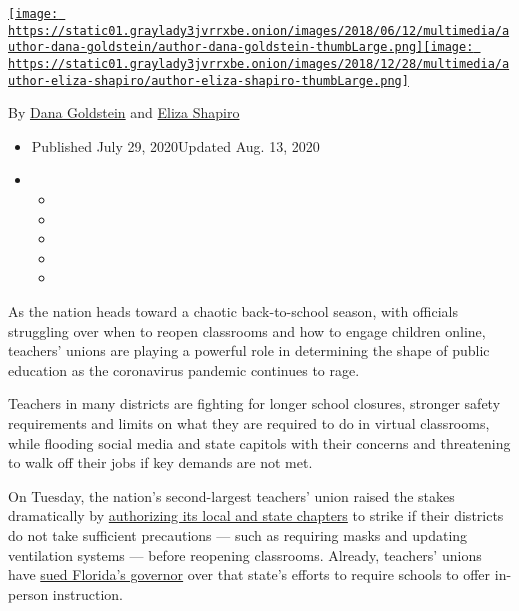 \href{https://www.nytimes3xbfgragh.onion/by/dana-goldstein}{\texttt{[image: https://static01.graylady3jvrrxbe.onion/images/2018/06/12/multimedia/author-dana-goldstein/author-dana-goldstein-thumbLarge.png]}}\href{https://www.nytimes3xbfgragh.onion/by/eliza-shapiro}{\texttt{[image: https://static01.graylady3jvrrxbe.onion/images/2018/12/28/multimedia/author-eliza-shapiro/author-eliza-shapiro-thumbLarge.png]}}

By \href{https://www.nytimes3xbfgragh.onion/by/dana-goldstein}{Dana
Goldstein} and
\href{https://www.nytimes3xbfgragh.onion/by/eliza-shapiro}{Eliza
Shapiro}

\begin{itemize}
\item
  Published July 29, 2020Updated Aug. 13, 2020
\item
  \begin{itemize}
  \item
  \item
  \item
  \item
  \item
  \end{itemize}
\end{itemize}

As the nation heads toward a chaotic back-to-school season, with
officials struggling over when to reopen classrooms and how to engage
children online, teachers' unions are playing a powerful role in
determining the shape of public education as the coronavirus pandemic
continues to rage.

Teachers in many districts are fighting for longer school closures,
stronger safety requirements and limits on what they are required to do
in virtual classrooms, while flooding social media and state capitols
with their concerns and threatening to walk off their jobs if key
demands are not met.

On Tuesday, the nation's second-largest teachers' union raised the
stakes dramatically by
\href{https://www.nytimes3xbfgragh.onion/2020/07/28/world/coronavirus-covid-19.html\#link-541bdc40}{authorizing
its local and state chapters} to strike if their districts do not take
sufficient precautions --- such as requiring masks and updating
ventilation systems --- before reopening classrooms. Already, teachers'
unions have
\href{https://www.nytimes3xbfgragh.onion/2020/07/20/world/coronavirus-cases.html\#link-2e69dc1c}{sued
Florida's governor} over that state's efforts to require schools to
offer in-person instruction.

